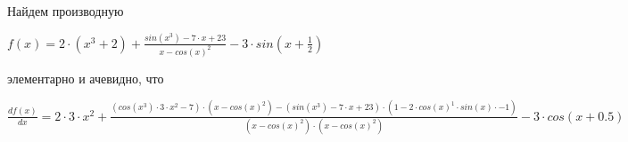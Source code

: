 \documentclass[12pt,a4paper]{scrartcl}
\begin{document}
Найдем производную 

 $f(x) = 2\cdot (x^3+2)+\frac{sin(x^3)-7\cdot x+23}{x-cos(x)^2}-3\cdot sin(x+\frac{1}{2})$

элементарно и ачевидно, что

 $\frac{df(x)}{dx} = 2\cdot 3\cdot x^2+\frac{(cos(x^3)\cdot 3\cdot x^2-7)\cdot (x-cos(x)^2)-(sin(x^3)-7\cdot x+23)\cdot (1-2\cdot cos(x)^1\cdot sin(x)\cdot -1)}{(x-cos(x)^2)\cdot (x-cos(x)^2)}-3\cdot cos(x+0.5)$
\end{document}
